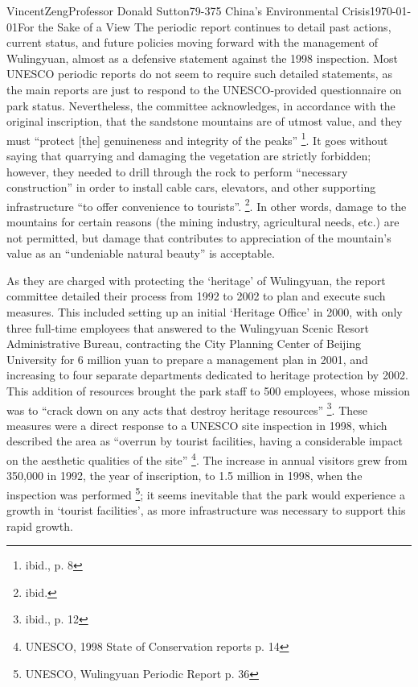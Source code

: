 \documentclass[12pt]{article}
\begin{document}
\begin{mla}{Vincent}{Zeng}{Professor Donald Sutton}{79-375 China's Environmental Crisis}{\today}{For the Sake of a View}
The periodic report continues to detail past actions, current status, and
future policies moving forward with the management of Wulingyuan, almost
as a defensive statement against the 1998 inspection. Most UNESCO periodic
reports do not seem to require such detailed statements,
as the main reports are just to respond to the UNESCO-provided questionnaire on
park status. Nevertheless, the committee acknowledges, in accordance with
the original inscription, that the sandstone mountains are of utmost
value, and they must ``protect [the] genuineness and integrity of the peaks'' \footnote{ibid., p. 8}.
It goes without saying that quarrying and damaging the vegetation are strictly
forbidden; however, they needed to drill through the rock to perform ``necessary
construction'' in order to install cable cars, elevators, and other
supporting infrastructure ``to offer convenience to tourists''. \footnote{ibid.}.
In other words, damage to the mountains for certain reasons (the mining
industry, agricultural needs, etc.) are not permitted, but damage that
contributes to appreciation of the mountain's value as an ``undeniable natural beauty''
is acceptable.

As they are charged with protecting the `heritage' of Wulingyuan, the report
committee detailed their process from 1992 to 2002 to plan and execute such
measures. This included setting up an initial `Heritage Office' in 2000,
with only three full-time employees that answered to the Wulingyuan Scenic Resort
Administrative Bureau, contracting the City Planning Center of Beijing
University for 6 million yuan to prepare a management plan in 2001, and
increasing to four separate departments dedicated to heritage protection by
2002. This addition of resources brought the park staff to 500 employees, whose mission was
to ``crack down on any acts that destroy heritage resources'' \footnote{ibid.,
p. 12}. These measures were a direct response to a UNESCO site inspection
in 1998, which described the area as ``overrun by tourist facilities, having a
considerable impact on the aesthetic qualities of the site'' \footnote{UNESCO,
1998 State of Conservation reports p. 14}. The increase in annual visitors grew from
350,000 in 1992, the year of inscription, to 1.5 million in 1998, when the
inspection was performed \footnote{UNESCO, Wulingyuan Periodic Report p. 36};
it seems inevitable that the park would experience a growth in
`tourist facilities', as more infrastructure was necessary to support this rapid growth.


\end{mla}
\end{document}
